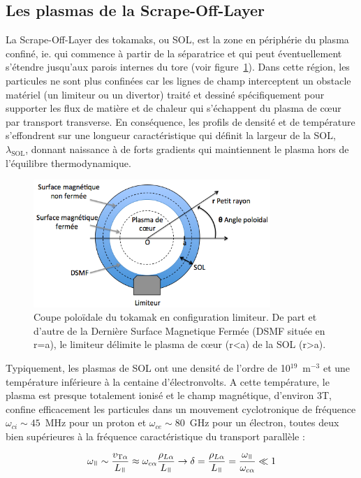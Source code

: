\begin{refsection}
\subsection{Les plasmas de la Scrape-Off-Layer}
La Scrape-Off-Layer des tokamaks, ou SOL, est la zone en
périphérie du plasma confiné, ie. qui commence à partir de la séparatrice et qui
peut éventuellement s'étendre jusqu'aux parois internes du tore (voir
figure~\ref{SOL}). Dans cette région, les
particules ne sont plus confinées car les lignes de champ interceptent un
obstacle matériel (un limiteur ou un divertor) traité et dessiné spécifiquement
pour supporter les flux de matière et de chaleur qui s'échappent du plasma de
c\oe ur par transport transverse.
En conséquence, les profils de densité et de température s'effondrent sur une
longueur caractéristique qui définit la largeur de la SOL, $\lambda_\text{SOL}$,
donnant naissance à de forts gradients qui maintiennent le plasma hors
de l'équilibre thermodynamique.

\begin{figure}[!htbp]
    \centering
	\includegraphics[width=0.8\textwidth]{figures/1-SOLLimiter.png}
	\caption{Coupe poloïdale du tokamak en configuration limiteur. De part et
	d'autre de la Dernière Surface Magnetique Fermée (DSMF située en r=a), le
	limiteur délimite le plasma de c\oe ur (r<a) de la SOL (r>a).}\label{SOL}
\end{figure}
 
Typiquement, les plasmas de SOL ont une densité de
l'ordre de 10$^{19}$~m$^{-3}$ et une température inférieure à la centaine
d'électronvolts. A cette température, le plasma est presque totalement ionisé et
le champ magnétique, d'environ 3T, confine efficacement les particules dans un
mouvement cyclotronique de fréquence $\omega_{ci}\sim45$~MHz pour un proton et
$\omega_{ce}\sim80$~GHz pour un électron, toutes deux bien supérieures à la
fréquence caractéristique du transport parallèle :

\begin{equation}
\omega_\para\sim
\frac{v_{\text{T}\alpha}}{L_\para}\approx\omega_{c\alpha}\frac{\rho_{L\alpha}}{L_\para}\rightarrow
\delta=\frac{\rho_{L\alpha}}{L_\para}=\frac{\omega_\para}{\omega_{c\alpha}}\ll1
\end{equation} 


\end{refsection}
